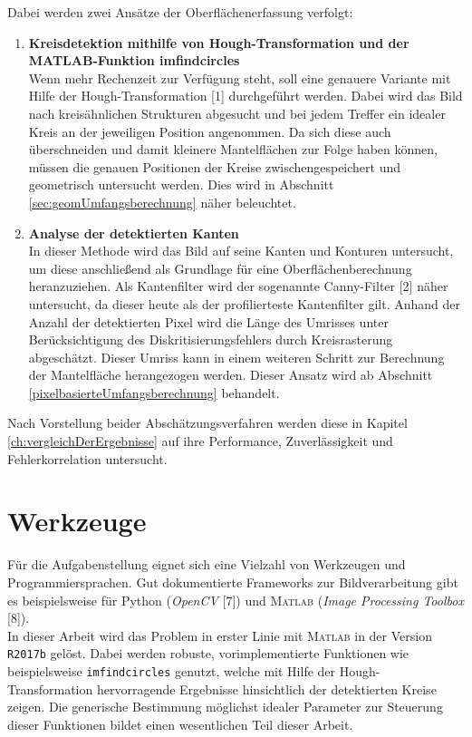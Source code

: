 \documentclass[accentcolor=tud1c, 11pt, toc=bib, toc=listof, captions=abovetable, parskip=half]{tudreport}
\begin{document}
Dabei werden zwei Ansätze der Oberflächenerfassung verfolgt:
\begin{enumerate}
\item \textbf{Kreisdetektion mithilfe von Hough-Transformation und der MATLAB-Funktion imfindcircles}\\
Wenn mehr Rechenzeit zur Verfügung steht, soll eine genauere Variante mit Hilfe der Hough-Transformation [1] durchgeführt werden. Dabei wird das Bild nach kreisähnlichen Strukturen abgesucht und bei jedem Treffer ein idealer Kreis an der jeweiligen Position angenommen. Da sich diese auch überschneiden und damit kleinere Mantelflächen zur Folge haben können, müssen die genauen Positionen der Kreise zwischengespeichert und geometrisch untersucht werden. Dies wird in Abschnitt \ref{sec:geomUmfangsberechnung} näher beleuchtet.
\item \textbf{Analyse der detektierten Kanten}\\
In dieser Methode wird das Bild auf seine Kanten und Konturen untersucht, um diese anschließend als Grundlage für eine Oberflächenberechnung heranzuziehen. Als Kantenfilter wird der sogenannte Canny-Filter [2] näher untersucht, da dieser heute als der profilierteste Kantenfilter gilt. Anhand der Anzahl der detektierten Pixel wird die Länge des Umrisses unter Berücksichtigung des Diskritisierungsfehlers durch Kreisrasterung abgeschätzt. Dieser Umriss kann in einem weiteren Schritt zur Berechnung der Mantelfläche herangezogen werden. Dieser Ansatz wird ab Abschnitt \ref{pixelbasierteUmfangsberechnung} behandelt.
\end{enumerate}
Nach Vorstellung beider Abschätzungsverfahren werden diese in Kapitel \ref{ch:vergleichDerErgebnisse} auf ihre Performance, Zuverlässigkeit und Fehlerkorrelation untersucht. 

\section{Werkzeuge}
Für die Aufgabenstellung eignet sich eine Vielzahl von Werkzeugen und Programmiersprachen. Gut dokumentierte Frameworks zur Bildverarbeitung gibt es beispielsweise für Python (\textit{OpenCV} [7]) und \textsc{Matlab} (\textit{Image Processing Toolbox} [8]).\\

In dieser Arbeit wird das Problem in erster Linie mit \textsc{Matlab} in der Version \lstinline|R2017b| gelöst. Dabei werden robuste, vorimplementierte  Funktionen wie beispielsweise \lstinline|imfindcircles| genutzt, welche mit Hilfe der Hough-Transformation hervorragende Ergebnisse hinsichtlich der detektierten Kreise zeigen. Die generische Bestimmung möglichst idealer Parameter zur Steuerung dieser Funktionen bildet einen wesentlichen Teil dieser Arbeit.\\
\end{document}
